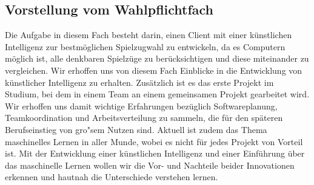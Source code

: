 \subsection{Vorstellung vom Wahlpflichtfach}\label{subsec:vorstellung-vom-wahlpflichtfach}
Die Aufgabe in diesem Fach besteht darin, einen Client mit einer k\"unstlichen Intelligenz zur bestm\"oglichen Spielzugwahl zu entwickeln, da es Computern m\"oglich ist, alle denkbaren Spielz\"uge zu ber\"ucksichtigen und diese miteinander zu vergleichen.
Wir erhoffen uns von diesem Fach Einblicke in die Entwicklung von k\"unstlicher Intelligenz zu erhalten.
Zus\"atzlich ist es das erste Projekt im Studium, bei dem in einem Team an einem gemeinsamen Projekt gearbeitet wird.
Wir erhoffen uns damit wichtige Erfahrungen bez\"uglich Softwareplanung, Teamkoordination und Arbeitsverteilung zu sammeln, die f\"ur den sp\"ateren Berufseinstieg von gro"sem Nutzen sind.
Aktuell ist zudem das Thema maschinelles Lernen in aller Munde, wobei es nicht f\"ur jedes Projekt von Vorteil ist.
Mit der Entwicklung einer k\"unstlichen Intelligenz und einer Einf\"uhrung \"uber das maschinelle Lernen wollen wir die Vor- und Nachteile beider Innovationen erkennen und hautnah die Unterschiede verstehen lernen.


\bigskip
\newpage